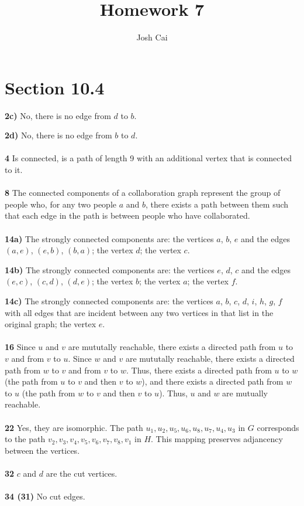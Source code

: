 \documentclass{article}
\begin{document}
\title{Homework 7}
\author{Josh Cai}

\maketitle
\section*{Section 10.4}

\textbf{2c)} No, there is no edge from $d$ to $b$.

\noindent\textbf{2d)} No, there is no edge from $b$ to $d$.
\\\\\noindent\textbf{4} Is connected, is a path of length 9 with an additional vertex that is connected to it.
\\\\\noindent\textbf{8} The connected components of a collaboration graph represent the group of people who, for any two people $a$ and $b$, there exists a path between them such that each edge in the path is between people who have collaborated.
\\\\\noindent\textbf{14a)} The strongly connected components are: the vertices $a$, $b$, $e$ and the edges $(a,e)$, $(e,b)$, $(b,a)$; the vertex $d$; the vertex $c$.

\noindent\textbf{14b)} The strongly connected components are: the vertices $e$, $d$, $c$ and the edges $(e,c)$, $(c,d)$, $(d,e)$; the vertex $b$; the vertex $a$; the vertex $f$.

\noindent\textbf{14c)} The strongly connected components are: the vertices $a$, $b$, $c$, $d$, $i$, $h$, $g$, $f$ with all edges that are incident between any two vertices in that list in the original graph; the vertex $e$.
\\\\\noindent\textbf{16} Since $u$ and $v$ are mututally reachable, there exists a directed path from $u$ to $v$ and from $v$ to $u$. Since $w$ and $v$ are mututally reachable, there exists a directed path from $w$ to $v$ and from $v$ to $w$. Thus, there exists a directed path from $u$ to $w$ (the path from $u$ to $v$ and then $v$ to $w$), and there exists a directed path from $w$ to $u$ (the path from $w$ to $v$ and then $v$ to $u$). Thus, $u$ and $w$ are mutually reachable.
\\\\\noindent\textbf{22} Yes, they are isomorphic. The path $u_1, u_2, u_5, u_6, u_8, u_7, u_4, u_3$ in $G$ corresponds to the path $v_2, v_3, v_4, v_5, v_6, v_7, v_8, v_1$ in $H$. This mapping preserves adjancency between the vertices.
\\\\\noindent\textbf{32} $c$ and $d$ are the cut vertices.
\\\\\noindent\textbf{34 (31)} No cut edges.
\end{document}
